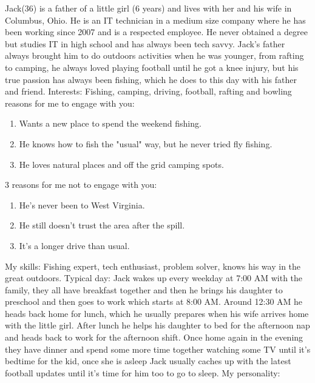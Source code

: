 Jack(36) is a father of a little girl (6 years) and lives with her and his wife in Columbus, Ohio. He is an IT technician in a medium size company where he has been working since 2007 and is a respected employee. He never obtained a degree but studies IT in high school and has always been tech savvy. Jack's father always brought him to do outdoors activities when he was younger, from rafting to camping, he always loved playing football until he got a knee injury, but his true passion has always been fishing, which he does to this day with his father and friend. \newline
Interests: Fishing, camping, driving, football, rafting and bowling  reasons for me to engage with you:
\begin{enumerate} 
\item Wants a new place to spend the weekend fishing. 
\item He knows how to fish the "usual" way, but he never tried fly fishing.
\item He loves natural places and off the grid camping spots.
\end{enumerate}
3 reasons for me not to engage with you:
\begin{enumerate}
\item He's never been to West Virginia.
\item He still doesn't trust the area after the spill. 
\item It's a longer drive than usual. 
\end{enumerate}
My skills: \newline
Fishing expert, tech enthusiast, problem solver, knows his way in the great outdoors. \newline
Typical day: \newline
Jack wakes up every weekday at 7:00 AM with the family, they all have breakfast together and then he brings his daughter to preschool and then goes to work which starts at 8:00 AM. Around 12:30 AM he heads back home for lunch, which he usually prepares when his wife arrives home with the little girl. After lunch he helps his daughter to bed for the afternoon nap and heads back to work for the afternoon shift. Once home again in the evening they have dinner and spend some more time together watching some TV until it's bedtime for the kid, once she is asleep Jack usually caches up with the latest football updates until it's time for him too to go to sleep. \newline
My personality: \newline
